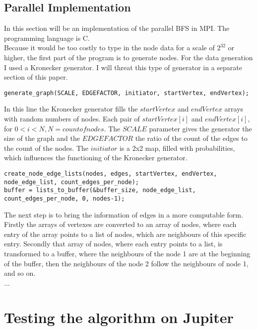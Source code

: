 \documentclass[11pt,a4paper]{article}
\begin{document}
\subsection{Parallel Implementation}
\label{sec:parallel-impl}

In this section will be an implementation of the parallel BFS in MPI.	The programming language is C.\\
Because it would be too costly to type in the node data for a scale of \(2^{32}\) or higher, the first part of the program is to generate nodes. For the data generation I used a Kronecker generator. I will threat this type of generator in a separate section of this paper.

\begin{lstlisting}
generate_graph(SCALE, EDGEFACTOR, initiator, startVertex, endVertex);
\end{lstlisting}

In this line the Kronecker generator fills the \(startVertex\) and \(endVertex\) arrays with random numbers of nodes. Each pair of \(startVertex[i]\) and \(endVertex[i]\), for \( 0 < i < N, N = count of nodes \). The \(SCALE\) parameter gives the generator the size of the graph and the \(EDGEFACTOR\) the ratio of the count of the edges to the count of the nodes. The \(initiator\) is a 2x2 map, filled with probabilities, which influences the functioning of the Kronecker generator.

\begin{lstlisting}
create_node_edge_lists(nodes, edges, startVertex, endVertex, node_edge_list, count_edges_per_node);
buffer = lists_to_buffer(&buffer_size, node_edge_list, count_edges_per_node, 0, nodes-1);
\end{lstlisting}

The next step is to bring the information of edges in a more computable form. Firstly the arrays of vertexes are converted to an array of nodes, where each entry of the array points to a list of nodes, which are neighbours of this specific entry. Secondly that array of nodes, where each entry points to a list, is transformed to a buffer, where the neighbours of the node 1 are at the beginning of the buffer, then the neighbours of the node 2 follow the neighbours of node 1, and so on.
\\
...

\section{Testing the algorithm on Jupiter}
\label{sec:testing}
\end{document}
